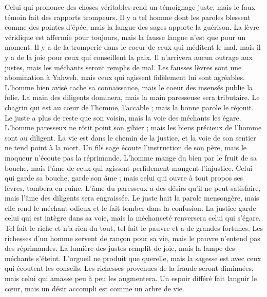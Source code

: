 \begin{multicols}{2}
Celui qui prononce des choses véritables rend un témoignage juste, mais le faux témoin fait des rapports trompeurs.
Il y a tel homme dont les paroles blessent comme des pointes d'épée, mais la langue des sages apporte la guérison.
La lèvre véridique est affermie pour toujours, mais la fausse langue n'est que pour un moment.
Il y a de la tromperie dans le coeur de ceux qui méditent le mal, mais il y a de la joie pour ceux qui conseillent la paix.
Il n'arrivera aucun outrage aux justes, mais les méchants seront remplis de mal.
Les fausses lèvres sont une abomination à Yahweh, mais ceux qui agissent fidèlement lui sont agréables.
L'homme bien avisé cache sa connaissance, mais le coeur des insensés publie la folie.
La main des diligents dominera, mais la main paresseuse sera tributaire.
Le chagrin qui est au cœur de l'homme, l'accable ; mais la bonne parole le réjouit.
Le juste a plus de reste que son voisin, mais la voie des méchants les égare.
L'homme paresseux ne rôtit point son gibier ; mais les biens précieux de l'homme sont au diligent.
La vie est dans le chemin de la justice, et la voie de son sentier ne tend point à la mort.
\VerseOne{}Un fils sage écoute l'instruction de son père, mais le moqueur n'écoute pas la réprimande.
L'homme mange du bien par le fruit de sa bouche, mais l'âme de ceux qui agissent perfidement mangent l'injustice.
Celui qui garde sa bouche, garde son âme ; mais celui qui ouvre à tout propos ses lèvres, tombera en ruine.
L'âme du paresseux a des désirs qu'il ne peut satisfaire, mais l'âme des diligents sera engraissée.
Le juste hait la parole mensongère, mais elle rend le méchant odieux et le fait tomber dans la confusion.
La justice garde celui qui est intègre dans sa voie, mais la méchanceté renversera celui qui s'égare.
Tel fait le riche et n'a rien du tout, tel fait le pauvre et a de grandes fortunes.
Les richesses d'un homme servent de rançon pour sa vie, mais le pauvre n'entend pas des réprimandes.
La lumière des justes remplit de joie, mais la lampe des méchants s'éteint.
L'orgueil ne produit que querelle, mais la sagesse est avec ceux qui écoutent les conseils.
Les richesses provenues de la fraude seront diminuées, mais celui qui amasse peu à peu les augmentera.
Un espoir différé fait languir le cœur, mais un désir accompli est comme un arbre de vie.

\end{multicols}
